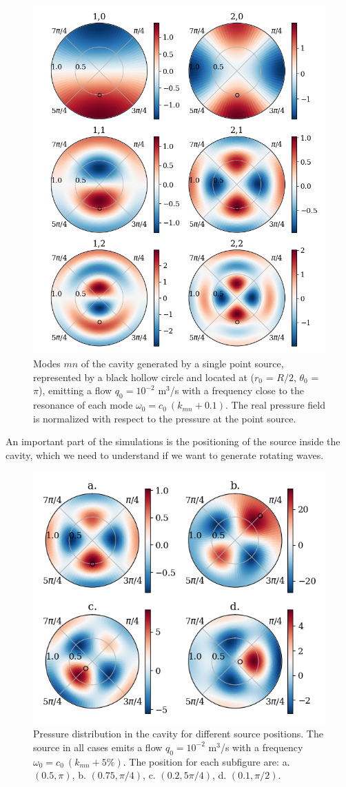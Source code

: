 \documentclass[%
 reprint,
 amsmath,amssymb,
 aip,
]{revtex4-1}
\begin{document}
\begin{figure}
    \centering
    \includegraphics[width=.5\textwidth]{figures/modes.png}
    \caption{Modes $mn$ of the cavity generated by a single point source, represented by a black hollow circle and located at ($r_0$ = $R/2$, $\theta_0$ = $\pi$), emitting a flow $q_0 = 10^{-2}$ m$^3$/s with a frequency close to the resonance of each mode $\omega_0 = c_0 \: (k_{mn} + 0.1)$. The real pressure field is normalized with respect to the pressure at the point source.}
    \label{fig:modes}
\end{figure}

An important part of the simulations is the positioning of the source inside the cavity, which we need to understand if we want to generate rotating waves. 

\begin{figure}
    \centering
    \includegraphics[width=.5\textwidth]{figures/source_pos.png}
    \caption{Pressure distribution in the cavity for different source positions. The source in all cases emits a flow $q_0 = 10^{-2}$ m$^3$/s with a frequency $\omega_0 = c_0 \: (k_{mn} + 5\%)$. The position for each subfigure are: a. $(0.5, \pi)$, b. $(0.75, \pi/4)$, c. $(0.2, 5 \pi/4)$, d. $(0.1, \pi/2)$.}
    \label{fig:source_pos}
\end{figure}
\end{document}
